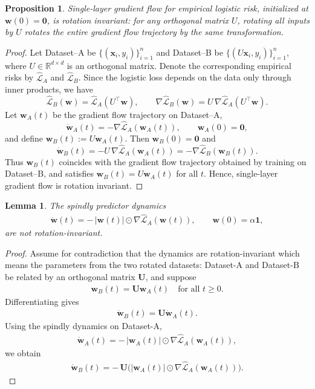 \documentclass{article}
\theoremstyle{plain}
\newtheorem{proposition}[theorem]{Proposition}
\newtheorem{lemma}[theorem]{Lemma}
\theoremstyle{definition}
\theoremstyle{remark}
\begin{document}
{\begin{proposition}
\label{single-layer-rot-restate}
Single-layer gradient flow for empirical logistic risk, initialized at $\mathbf w(0)=\mathbf 0$, is rotation invariant: for any orthogonal matrix $U$, rotating all inputs by $U$ rotates the entire gradient flow trajectory by the same transformation.
\end{proposition}

\begin{proof}
    Let Dataset--A be $\{(\mathbf x_i,y_i)\}_{i=1}^n$ and Dataset--B be $\{(U\mathbf x_i,y_i)\}_{i=1}^n$, where $U\in\mathbb R^{d\times d}$ is an orthogonal matrix. Denote the corresponding empirical risks by $\widehat{\mathcal L}_A$ and $\widehat{\mathcal L}_B$. Since the logistic loss depends on the data only through inner products, we have
\[
\widehat{\mathcal L}_B(\mathbf w)
=
\widehat{\mathcal L}_A(U^\top \mathbf w),
\qquad
\nabla \widehat{\mathcal L}_B(\mathbf w)
=
U\,\nabla \widehat{\mathcal L}_A(U^\top \mathbf w).
\]
Let $\mathbf w_A(t)$ be the gradient flow trajectory on Dataset--A,
\[
\dot{\mathbf w}_A(t) = -\nabla \widehat{\mathcal L}_A(\mathbf w_A(t)),
\qquad
\mathbf w_A(0)=\mathbf 0,
\]
and define $\mathbf w_B(t):=U\mathbf w_A(t)$. Then $\mathbf w_B(0)=\mathbf 0$ and
\[
\dot{\mathbf w}_B(t)
=
-U\,\nabla \widehat{\mathcal L}_A(\mathbf w_A(t))
=
-\nabla \widehat{\mathcal L}_B(\mathbf w_B(t)).
\]
Thus $\mathbf w_B(t)$ coincides with the gradient flow trajectory obtained by training on Dataset--B, and satisfies $\mathbf w_B(t)=U\mathbf w_A(t)$ for all $t$. Hence, single-layer gradient flow is rotation invariant.
\end{proof}

\begin{lemma}
The spindly predictor dynamics
\begin{align}
\dot{\mathbf w}(t)
=
-\,|\mathbf w(t)| \odot \nabla \widehat{\mathcal L}_A(\mathbf w(t)),
\qquad
\mathbf w(0)=\alpha \mathbf 1,
\end{align}
are not rotation-invariant.
\end{lemma}

\begin{proof}
Assume for contradiction that the dynamics are rotation-invariant which means the parameters from the two rotated datasets: Dataset-A and Dataset-B be related by an orthogonal matrix 
$\mathbf U$, and suppose
\begin{align}
\mathbf w_B(t) = \mathbf U \mathbf w_A(t)
\quad \text{for all } t \ge 0.
\end{align}
Differentiating gives
\begin{align}
\dot{\mathbf w}_B(t) = \mathbf U \dot{\mathbf w}_A(t).
\end{align}
Using the spindly dynamics on Dataset-A,
\begin{align}
\dot{\mathbf w}_A(t)
=
-\,|\mathbf w_A(t)| \odot 
\nabla \widehat{\mathcal L}_A(\mathbf w_A(t)),
\end{align}
we obtain
\begin{align}
\dot{\mathbf w}_B(t)
=
-\,\mathbf U
\big(
|\mathbf w_A(t)| \odot 
\nabla \widehat{\mathcal L}_A(\mathbf w_A(t))
\big).
\tag{1}
\end{align}


\end{proof}}
\end{document}
